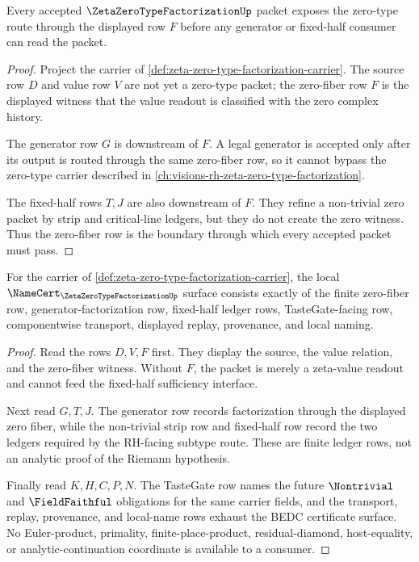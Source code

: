 \begin{theorem}
\label{thm:zeta-zero-type-factorization-zero-fiber}
Every accepted $\ZetaZeroTypeFactorizationUp$ packet exposes the zero-type route through the displayed row $F$ before any generator or fixed-half consumer can read the packet.
\end{theorem}
\begin{proof}
Project the carrier of \autoref{def:zeta-zero-type-factorization-carrier}. The source row $D$ and value row $V$ are not yet a zero-type packet; the zero-fiber row $F$ is the displayed witness that the value readout is classified with the zero complex history.

The generator row $G$ is downstream of $F$. A legal generator is accepted only after its output is routed through the same zero-fiber row, so it cannot bypass the zero-type carrier described in \autoref{ch:visions-rh-zeta-zero-type-factorization}.

The fixed-half rows $T,J$ are also downstream of $F$. They refine a non-trivial zero packet by strip and critical-line ledgers, but they do not create the zero witness. Thus the zero-fiber row is the boundary through which every accepted packet must pass.
\end{proof}

\begin{theorem}
\label{thm:zeta-zero-type-factorization-ledger}
For the carrier of \autoref{def:zeta-zero-type-factorization-carrier}, the local $\NameCert_{\ZetaZeroTypeFactorizationUp}$ surface consists exactly of the finite zero-fiber row, generator-factorization row, fixed-half ledger rows, TasteGate-facing row, componentwise transport, displayed replay, provenance, and local naming.
\end{theorem}
\begin{proof}
Read the rows $D,V,F$ first. They display the source, the value relation, and the zero-fiber witness. Without $F$, the packet is merely a zeta-value readout and cannot feed the fixed-half sufficiency interface.

Next read $G,T,J$. The generator row records factorization through the displayed zero fiber, while the non-trivial strip row and fixed-half row record the two ledgers required by the RH-facing subtype route. These are finite ledger rows, not an analytic proof of the Riemann hypothesis.

Finally read $K,H,C,P,N$. The TasteGate row names the future $\Nontrivial$ and $\FieldFaithful$ obligations for the same carrier fields, and the transport, replay, provenance, and local-name rows exhaust the BEDC certificate surface. No Euler-product, primality, finite-place-product, residual-diamond, host-equality, or analytic-continuation coordinate is available to a consumer.
\end{proof}

